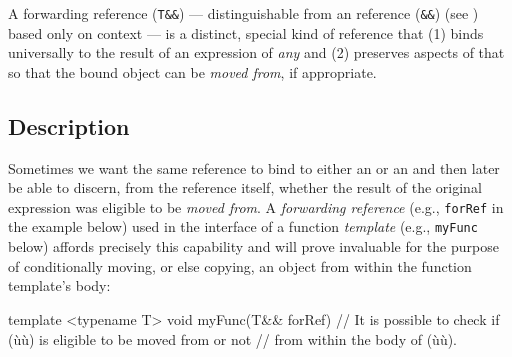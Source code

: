 

\setcounter{table}{0}
\setcounter{footnote}{0}
\setcounter{lstlisting}{0}

A forwarding reference (\lstinline!T&&!) --- distinguishable from an
 reference (\lstinline!&&!) (see ) 
based only on context
--- is a distinct, special kind of reference that (1) binds
universally to the result of an expression of \emph{any}  and (2) preserves aspects of that  so
that the bound object can be \emph{moved from}, if appropriate.

\subsection[Description]{Description}\label{description-forwardingref}

Sometimes we want the same reference to bind to either an
 or an  and then later be able to discern,
from the reference itself, whether the result of the original expression
was eligible to be \emph{moved from}. A \emph{forwarding reference}
(e.g., \lstinline!forRef! in the example below) used in the interface of a function
\emph{template} (e.g., \lstinline!myFunc! below) affords precisely this
capability and will prove invaluable for the purpose of conditionally
moving, or else copying, an object from within the function template's
body:

\begin{emcppslisting}
template <typename T>
void myFunc(T&& forRef)
{
    // It is possible to check if (ù{}ù) is eligible to be moved from or not
    // from within the body of (ù{}ù).
}
\end{emcppslisting}

